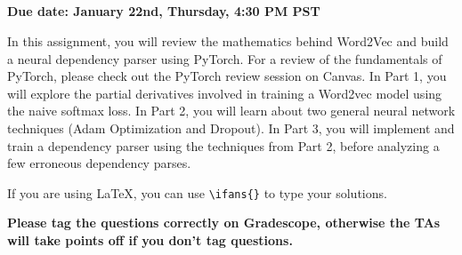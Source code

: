 \documentclass[answers]{exam}
\title{
\textmd{\textbf{\hmwkClass\ \hmwkTitle}}
}
\author{}
\date{}
\begin{document}
\vspace{-1in}

\maketitle

\vspace{-0.5in}


\textbf{Due date: January 22nd, Thursday, 4:30 PM PST}


In this assignment, you will review the mathematics behind Word2Vec and build a neural dependency parser using PyTorch. For a review of the fundamentals of PyTorch, please check out the PyTorch review session on Canvas. In Part 1, you will explore the partial derivatives involved in training a Word2vec model using the naive softmax loss. In Part 2, you will learn about two general neural network techniques (Adam Optimization and Dropout). In Part 3, you will implement and train a dependency parser using the techniques from Part 2, before analyzing a few erroneous dependency parses.

If you are using LaTeX, you can use \verb!\ifans{}! to type your solutions.

\textbf{Please tag the questions correctly on Gradescope, otherwise the TAs will take points off if you don't tag questions.}


\begin{questions}
    
    \newpage
    
    \newpage
    
\end{questions}


\end{document}
